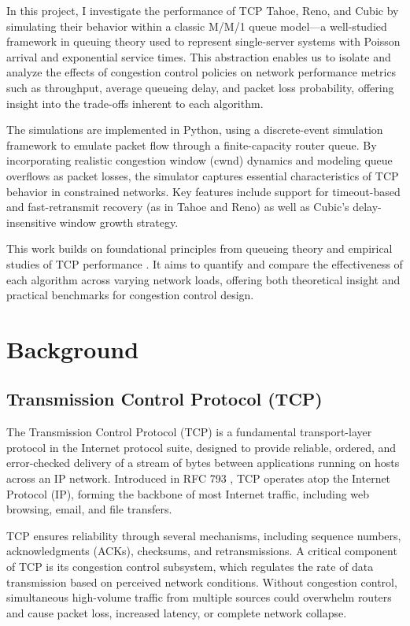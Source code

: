 \documentclass[conference]{IEEEtran}
\begin{document}
In this project, I investigate the performance of TCP Tahoe, Reno, and Cubic by simulating their behavior within a classic M/M/1 queue model—a well-studied framework in queuing theory used to represent single-server systems with Poisson arrival and exponential service times. 
This abstraction enables us to isolate and analyze the effects of congestion control policies on network performance metrics such as throughput, average queueing delay, and packet loss probability, offering insight into the trade-offs inherent to each algorithm.

The simulations are implemented in Python, using a discrete-event simulation framework to emulate packet flow through a finite-capacity router queue. 
By incorporating realistic congestion window (cwnd) dynamics and modeling queue overflows as packet losses, the simulator captures essential characteristics of TCP behavior in constrained networks. 
Key features include support for timeout-based and fast-retransmit recovery (as in Tahoe and Reno) as well as Cubic’s delay-insensitive window growth strategy.

This work builds on foundational principles from queueing theory \cite{b1} and empirical studies of TCP performance \cite{b2}\cite{b3}. 
It aims to quantify and compare the effectiveness of each algorithm across varying network loads, offering both theoretical insight and practical benchmarks for congestion control design.

\section{Background}
\subsection{Transmission Control Protocol (TCP)}
The Transmission Control Protocol (TCP) is a fundamental transport-layer protocol in the Internet protocol suite, designed to provide reliable, ordered, and error-checked delivery of a stream of bytes between applications running on hosts across an IP network. 
Introduced in RFC 793 \cite{b4}, TCP operates atop the Internet Protocol (IP), forming the backbone of most Internet traffic, including web browsing, email, and file transfers.

TCP ensures reliability through several mechanisms, including sequence numbers, acknowledgments (ACKs), checksums, and retransmissions. 
A critical component of TCP is its congestion control subsystem, which regulates the rate of data transmission based on perceived network conditions. 
Without congestion control, simultaneous high-volume traffic from multiple sources could overwhelm routers and cause packet loss, increased latency, or complete network collapse.
\end{document}
